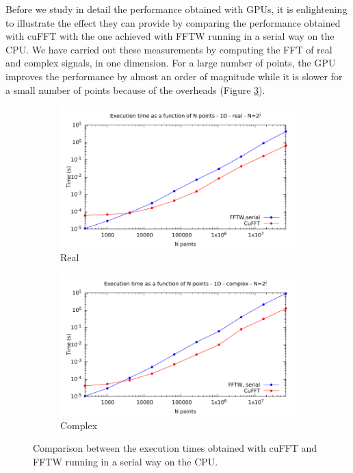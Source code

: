 \documentclass[12pt, a4paper]{article}
\begin{document}
Before we study in detail the performance obtained with GPUs, it is
enlightening to illustrate the effect they can provide by comparing
the performance obtained with cuFFT with the one achieved with FFTW
running in a serial way on the CPU. We have carried out these
measurements by computing the FFT of real and complex signals, in one
dimension. For a large number of points, the GPU improves the
performance by almost an order of magnitude while it is slower for a
small number of points because of the overheads (Figure
\ref{COMPGPUCPU}).
\begin{figure}[H]
\captionsetup{width=0.8\linewidth}
\centering
\begin{subfigure}{.5\textwidth}
\centering
\includegraphics[width=.9\linewidth]{graphs/gpucpucomparison-r.pdf}
\caption{Real}
\label{GPUCPUR}
\end{subfigure}%
\begin{subfigure}{.5\textwidth}
\centering
\includegraphics[width=.9\linewidth]{graphs/gpucpucomparison-c.pdf}
\caption{Complex}
\label{GPUCPUC}
\end{subfigure}
\caption{Comparison between the execution times obtained with cuFFT and FFTW running in a serial way on the CPU.}
\label{COMPGPUCPU}
\end{figure}
\end{document}
